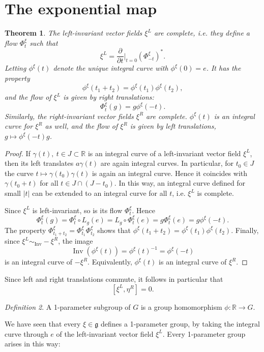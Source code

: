 \documentclass{article}
\newtheorem{theorem}{Theorem}[section]
\theoremstyle{remark}
\newtheorem{definition}[theorem]{Definition}
\newcommand{\R}{\mathbb{R}}
\newcommand\lie[1]{\mathfrak{#1}}
\newcommand{\g}{\lie{g}}
\newcommand{\on}{\operatorname}
\newcommand{\f}{\frac}
\newcommand{\p}{\partial}
\begin{document}
\section{The exponential map}
%
\begin{theorem}
The left-invariant vector fields $\xi^L$ are complete, i.e. they define a flow 
$\Phi^\xi_t$ such that 
\[ \xi^L=\f{\p}{\p t}|_{t=0}(\Phi^\xi_{-t})^*.\]
% 
Letting $\phi^\xi(t)$ denote the unique integral curve with $\phi^\xi(0)=e$. 
It has the property 
\[ \phi^\xi(t_1+t_2)=\phi^\xi(t_1)\phi^\xi(t_2),\]
and the flow of $\xi^L$ is given by right translations:
%
\[ \Phi^\xi_t(g)=g\phi^\xi(-t).\]
%
Similarly, the right-invariant vector fields $\xi^R$ are complete. 
$\phi^\xi(t)$ is an integral curve for $\xi^R$ as well, and
the flow of $\xi^R$ is  given by left translations, $g\mapsto \phi^\xi(-t)g$. 
\end{theorem}
\begin{proof}
If $\gamma(t),\ t\in J\subset \R$ is an integral curve of a
left-invariant vector field $\xi^L$, then its left translates
$a\gamma(t)$ are again integral curves. In particular, for $t_0\in J$
the curve $t\mapsto \gamma(t_0)\gamma(t)$ is again an integral
curve. Hence it coincides with $\gamma(t_0+t)$ for all $t\in J\cap
(J-t_0)$. In this way, an integral curve defined for small $|t|$ can
be extended to an integral curve for all $t$, i.e. $\xi^L$ is complete. 

Since $\xi^L$ is left-invariant, so is its flow $\Phi^\xi_t$. Hence 
\[ \Phi^\xi_t(g)=\Phi^\xi_t \circ L_g(e)=L_g\circ \Phi^\xi_t(e)
=g \Phi^\xi_t(e)=g\phi^\xi(-t).\] The property 
$\Phi^\xi_{t_1+t_2}=\Phi^\xi_{t_1}\Phi^\xi_{t_2}$ shows that 
$\phi^\xi(t_1+t_2)=\phi^\xi(t_1)\phi^\xi(t_2)$. Finally, since 
$\xi^L\sim_{\on{Inv}}-\xi^R$, the image 
\[ \on{Inv}(\phi^\xi(t))=\phi^\xi(t)^{-1}=\phi^\xi(-t)\]
is an integral curve of $-\xi^R$. Equivalently, $\phi^\xi(t)$ is an integral curve of $\xi^R$. 
\end{proof}
%
Since left and right translations commute, it follows in particular that 
\[[\xi^L,\eta^R]=0.\]

\begin{definition}
A 1-parameter subgroup of $G$ is a group homomorphism $\phi\colon \R\to G$.
\end{definition}
%
We have seen that every $\xi\in\g$ defines a 1-parameter group, by taking 
the integral curve through $e$ of the left-invariant vector field $\xi^L$. 
Every 1-parameter group arises in this way: 
\end{document}
